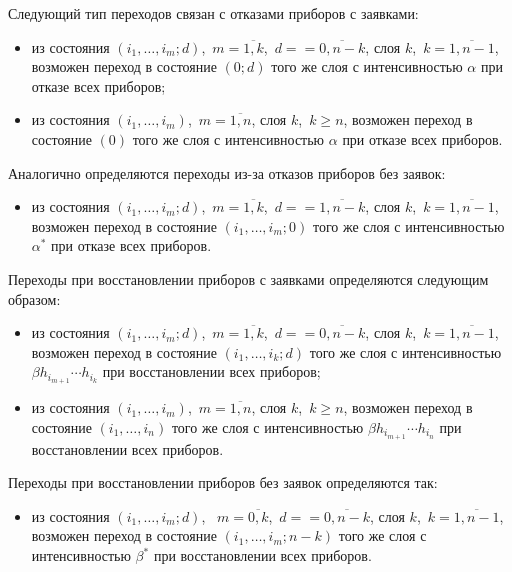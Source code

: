 \begin{multicols}{2}
Следующий тип переходов связан с отказами приборов с заявками:
\begin{itemize}
\item из состояния
$(i_1,\ldots,i_{m};d)$,\  $m=\overline{1,k}$,\  $d=$\linebreak $=\overline{0,n-k}$,
слоя $k$,\  $k=\overline{1,n-1}$, возможен переход в состояние
$(0;d)$
того же слоя с интен\-сив\-ностью $\alpha$ при отказе всех приборов;
\item
из состояния
$(i_1,\ldots,i_{m})$,\  $m=\overline{1,n}$,
слоя $k$,\  $k\ge n$, возможен переход в состояние
$(0)$
того же слоя с интенсивностью $\alpha$ при отказе всех приборов.
\end{itemize}

Аналогично определяются переходы из-за отказов приборов без заявок:
\begin{itemize}
\item из состояния
$(i_1,\ldots,i_{m};d)$,\  $m=\overline{1,k}$,\  $d=$\linebreak $=\overline{1,n-k}$,
слоя $k$,\  $k=\overline{1,n-1}$, возможен переход в состояние
$ (i_1,\ldots,i_{m};0)$
того же слоя с интенсивностью $\alpha^*$ при отказе всех приборов.
\end{itemize}

Переходы при восстановлении приборов с заявками определяются
следующим образом:
\begin{itemize}
\item
из состояния
$(i_1,\ldots,i_{m};d)$,\  $m=\overline{1,k}$,\  $d=$\linebreak $=\overline{0,n-k}$,
слоя $k$,\ $k=\overline{1,n-1}$, возможен переход в состояние
$(i_1,\ldots,i_{k};d)$
того же слоя с интенсивностью $\beta h_{i_{m+1}}\cdots h_{i_k}$
при вос\-ста\-нов\-ле\-нии всех приборов;
\item
из состояния
$(i_1,\ldots,i_{m})$,\  $m=\overline{1,n}$,
слоя $k$,\  $k\ge n$, возможен переход в состояние
$(i_1,\ldots,i_{n})$
того же слоя с интенсивностью $\beta h_{i_{m+1}}\cdots h_{i_n}$
при восстановлении всех приборов.
\end{itemize}

Переходы при восстановлении приборов без заявок определяются так:
\begin{itemize}
\item
из состояния
$(i_1,\ldots,i_{m};d)$, \ $m=\overline{0,k}$,\  $d=$\linebreak $=\overline{0,n-k}$,
слоя $k$,\ $k=\overline{1,n-1}$, возможен переход в состояние
$(i_1,\ldots,i_{m};n-k)$
того же слоя с интенсивностью $\beta^*$ при восстановлении всех
приборов.
\end{itemize}


\end{multicols}
